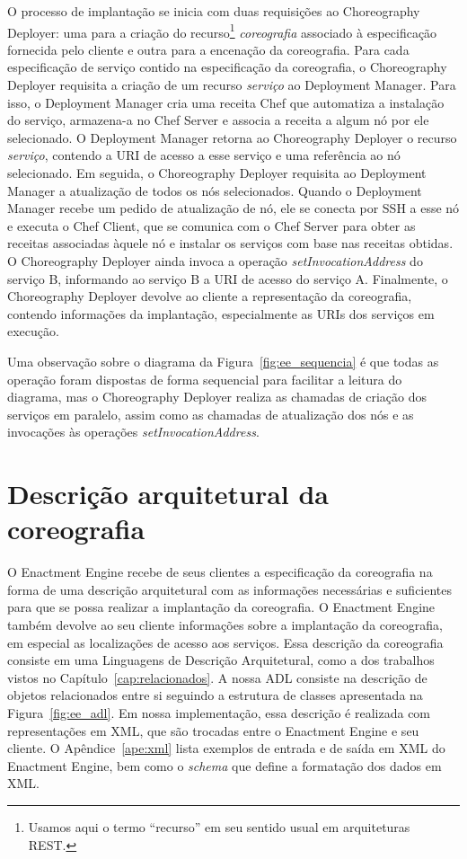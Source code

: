 O processo de implantação se inicia com duas requisições ao Choreography Deployer: uma para a criação do recurso\footnote{Usamos aqui o termo ``recurso'' em seu sentido usual em arquiteturas REST.} \emph{coreografia} associado à especificação fornecida pelo cliente e outra para a encenação da coreografia. Para cada especificação de serviço contido na especificação da coreografia, o Choreography Deployer requisita a criação de um recurso \emph{serviço} ao Deployment Manager. Para isso, o Deployment Manager cria uma receita Chef que automatiza a instalação do serviço, armazena-a no Chef Server e associa a receita a algum nó por ele selecionado. O Deployment Manager retorna ao Choreography Deployer o recurso \emph{serviço}, contendo a URI de acesso a esse serviço e uma referência ao nó selecionado. Em seguida, o Choreography Deployer requisita ao Deployment Manager a atualização de todos os nós selecionados. Quando o Deployment Manager recebe um pedido de atualização de nó, ele se conecta por SSH a esse nó e executa o Chef Client, que se comunica com o Chef Server para obter as receitas associadas àquele nó e instalar os serviços com base nas receitas obtidas. O Choreography Deployer ainda invoca a operação \emph{setInvocationAddress} do serviço B, informando ao serviço B a URI de acesso do serviço A. Finalmente, o Choreography Deployer devolve ao cliente a representação da coreografia, contendo informações da implantação, especialmente as URIs dos serviços em execução.

Uma observação sobre o diagrama da Figura~\ref{fig:ee_sequencia} é que todas as operação foram dispostas de forma sequencial para facilitar a leitura do diagrama, mas o Choreography Deployer realiza as chamadas de criação dos serviços em paralelo, assim como as chamadas de atualização dos nós e as invocações às operações \emph{setInvocationAddress}.

\section{Descrição arquitetural da coreografia}
\label{sec:adl}

O Enactment Engine recebe de seus clientes a especificação da coreografia na forma de uma descrição arquitetural com as informações necessárias e suficientes para que se possa realizar a implantação da coreografia. O Enactment Engine também devolve ao seu cliente informações sobre a implantação da coreografia, em especial as localizações de acesso aos serviços. Essa descrição da coreografia consiste em uma Linguagens de Descrição Arquitetural, como a dos trabalhos vistos no Capítulo~\ref{cap:relacionados}. A nossa ADL consiste na descrição de objetos relacionados entre si seguindo a estrutura de classes apresentada na Figura~\ref{fig:ee_adl}. Em nossa implementação, essa descrição é realizada com representações em XML, que são trocadas entre o Enactment Engine e seu cliente. O Apêndice~\ref{ape:xml} lista exemplos de entrada e de saída em XML do Enactment Engine, bem como o \emph{schema} que define a formatação dos dados em XML.  

